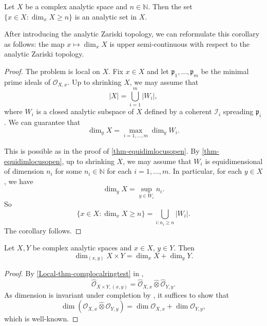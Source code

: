 \begin{corollary}
    Let $X$ be a complex analytic space and $n\in \mathbb{N}$. Then the set $\{x\in X:\dim_x X\geq n\}$ is an analytic set in $X$.

\end{corollary}
After introducing the analytic Zariski topology, we can reformulate this corollary as follows: the map $x\mapsto \dim_x X$ is upper semi-continuous with respect to the analytic Zariski topology.
\begin{proof}
    The problem is local on $X$. Fix $x\in X$ and let $\mathfrak{p}_1,\ldots,\mathfrak{p}_m$ be the minimal prime ideals of $\mathcal{O}_{X,x}$. Up to shrinking $X$, we may assume that 
    \[
        |X|=\bigcup_{i=1}^m |W_i|,  
    \]
    where $W_i$ is a closed analytic subspace of $X$ defined by a coherent $\mathcal{I}_i$ spreading $\mathfrak{p}_i$. We can guarantee that
    \[
        \dim_y X=\max_{i=1,\ldots,m}\dim_y W_i.   
    \]
    
    This is possible as in the proof of \cref{thm-equidimlocusopen}. By \cref{thm-equidimlocusopen}, up to shrinking $X$, we may assume that $W_i$ is equidimensional of dimension $n_i$ for some $n_i\in \mathbb{N}$ for each $i=1,\ldots,m$. In particular, for each $y\in X$, we have
    \[
        \dim_y X=\sup_{y\in W_i} n_i.  
    \]
    So 
    \[
        \{x\in X:\dim_x X\geq n\}=\bigcup_{i: n_i\geq n} |W_i|.  
    \]
    The corollary follows.
\end{proof}



\begin{proposition}
    Let $X,Y$ be complex analytic spaces and $x\in X$, $y\in Y$. Then
    \[
        \dim_{(x,y)}X\times Y=\dim_x X+\dim_y Y.  
    \]
\end{proposition}
\begin{proof}
    By \cref{Local-thm-complocalringtest} in ,
    \[
        \hat{\mathcal{O}}_{X\times Y,(x,y)}=\hat{\mathcal{O}}_{X,x}\hat{\otimes}\hat{\mathcal{O}}_{Y,y}.  
    \]
    As dimension is invariant under completion by \cite[\href{https://stacks.math.columbia.edu/tag/07NV}{Tag 07NV}]{stacks-project}, it suffices to show that
    \[
        \dim (\mathcal{O}_{X,x}\hat{\otimes} \mathcal{O}_{Y,y}) =\dim \mathcal{O}_{X,x}+\dim \mathcal{O}_{Y,y}, 
    \]
    which is well-known.
\end{proof}

